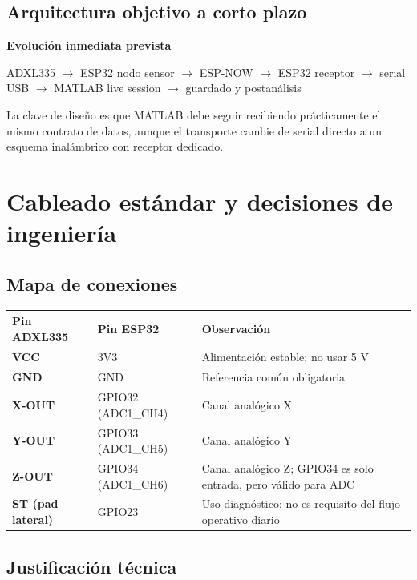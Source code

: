 \documentclass[11pt,a4paper]{article}
\begin{document}
\subsection{Arquitectura objetivo a corto plazo}

\begin{roadmapbox}
\textbf{Evolución inmediata prevista}\par
ADXL335 $\rightarrow$ ESP32 nodo sensor $\rightarrow$ ESP-NOW $\rightarrow$ ESP32 receptor $\rightarrow$ serial USB $\rightarrow$ MATLAB live session $\rightarrow$ guardado y postanálisis
\end{roadmapbox}

La clave de diseño es que MATLAB debe seguir recibiendo prácticamente el mismo contrato de datos, aunque el transporte cambie de serial directo a un esquema inalámbrico con receptor dedicado.

\section{Cableado estándar y decisiones de ingeniería}

\subsection{Mapa de conexiones}

\begin{center}
\renewcommand{\arraystretch}{1.35}
\begin{tabularx}{\textwidth}{>{\bfseries}p{3.0cm}p{3.8cm}X}
\toprule
Pin ADXL335 & Pin ESP32 & Observación \\
\midrule
VCC & 3V3 & Alimentación estable; no usar 5 V \\
GND & GND & Referencia común obligatoria \\
X-OUT & GPIO32 (ADC1\_CH4) & Canal analógico X \\
Y-OUT & GPIO33 (ADC1\_CH5) & Canal analógico Y \\
Z-OUT & GPIO34 (ADC1\_CH6) & Canal analógico Z; GPIO34 es solo entrada, pero válido para ADC \\
ST (pad lateral) & GPIO23 & Uso diagnóstico; no es requisito del flujo operativo diario \\
\bottomrule
\end{tabularx}
\end{center}

\subsection{Justificación técnica}
\end{document}
